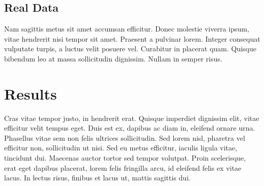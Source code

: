 \documentclass[11pt]{article}
\begin{document}
\subsection{Real Data}
Nam sagittis metus sit amet accumsan efficitur. Donec molestie viverra ipsum, vitae hendrerit nisi tempor sit amet.
Praesent a pulvinar lorem. Integer consequat vulputate turpis, a luctus velit posuere vel. Curabitur in placerat quam.
Quisque bibendum leo at massa sollicitudin dignissim. Nullam in semper risus.

\section{Results}

Cras vitae tempor justo, in hendrerit erat. Quisque imperdiet dignissim elit, vitae efficitur velit tempus eget. Duis
est ex, dapibus ac diam in, eleifend ornare urna. Phasellus vitae sem non felis ultrices sollicitudin. Sed lorem nisl,
pharetra vel efficitur non, sollicitudin ut nisi. Sed eu metus efficitur, iaculis ligula vitae, tincidunt dui. Maecenas
auctor tortor sed tempor volutpat. Proin scelerisque, erat eget dapibus placerat, lorem felis fringilla arcu, id
eleifend felis ex vitae lacus. In lectus risus, finibus et lacus ut, mattis sagittis dui.
\end{document}
